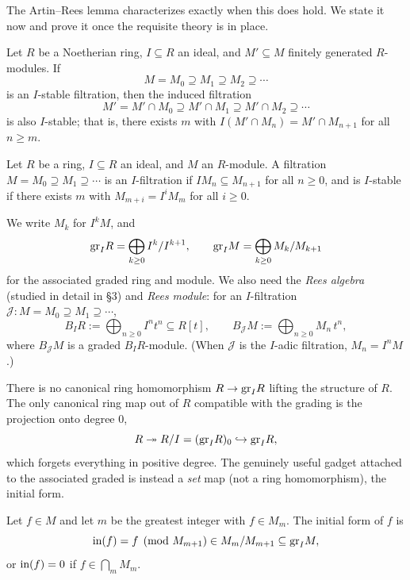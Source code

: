 \documentclass[11pt]{article}
\begin{document}
The Artin--Rees lemma characterizes exactly when this does hold. We state it now and prove it once the requisite theory is in place.

\begin{lemma}
    Let $R$ be a Noetherian ring, $I \subseteq R$ an ideal, and $M' \subseteq M$ finitely generated $R$-modules. If
    \[M = M_0 \supseteq M_1 \supseteq M_2 \supseteq \cdots\]
    is an $I$-stable filtration, then the induced filtration
    \[M' = M' \cap M_0 \supseteq M' \cap M_1 \supseteq M' \cap M_2 \supseteq \cdots\]
    is also $I$-stable; that is, there exists $m$ with $I(M' \cap M_n) = M' \cap M_{n+1}$ for all $n \geq m$.
\end{lemma}

\begin{definition}
    Let $R$ be a ring, $I \subseteq R$ an ideal, and $M$ an $R$-module. A filtration $M = M_0 \supseteq M_1 \supseteq \cdots$ is an $I$-filtration if $IM_n \subseteq M_{n+1}$ for all $n \geq 0$, and is $I$-stable if there exists $m$ with $M_{m+i} = I^i M_m$ for all $i \geq 0$.
\end{definition}

\begin{notation}
    We write $M_k$ for $I^kM$, and
    \[\text{gr}_I R = \bigoplus_{k \geq 0} I^k/I^{k+1}, \qquad \text{gr}_I M = \bigoplus_{k \geq 0} M_k/M_{k+1}\]
    for the associated graded ring and module. We also need the \emph{Rees algebra} (studied in detail in \S3) and \emph{Rees module}: for an $I$-filtration $\mathcal{J}: M = M_0 \supseteq M_1 \supseteq \cdots$,
    \[B_I R := \bigoplus_{n \geq 0} I^n t^n \subseteq R[t], \qquad B_{\mathcal{J}} M := \bigoplus_{n \geq 0} M_n\, t^n,\]
    where $B_{\mathcal{J}}M$ is a graded $B_I R$-module. (When $\mathcal{J}$ is the $I$-adic filtration, $M_n = I^n M$.)
\end{notation}

There is no canonical ring homomorphism $R \to \text{gr}_I R$ lifting the structure of $R$. The only canonical ring map out of $R$ compatible with the grading is the projection onto degree $0$,
\[R \twoheadrightarrow R/I = (\text{gr}_I R)_0 \hookrightarrow \text{gr}_I R,\]
which forgets everything in positive degree. The genuinely useful gadget attached to the associated graded is instead a \emph{set} map (not a ring homomorphism), the initial form.

\begin{definition}
    Let $f \in M$ and let $m$ be the greatest integer with $f \in M_m$. The initial form of $f$ is
    \[\text{in}(f) = f \pmod{M_{m+1}} \in M_m/M_{m+1} \subseteq \text{gr}_I M,\]
    or $\text{in}(f) = 0$ if $f \in \bigcap_{m} M_m$.
\end{definition}
\end{document}
